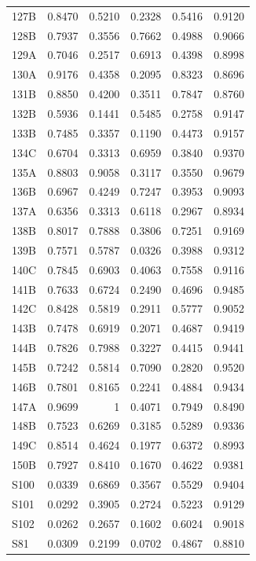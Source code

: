 \begin{longtable}{lrrrrr}
  127B & 0.8470 & 0.5210 & 0.2328 & 0.5416 & 0.9120 \\
  128B & 0.7937 & 0.3556 & 0.7662 & 0.4988 & 0.9066 \\
  129A & 0.7046 & 0.2517 & 0.6913 & 0.4398 & 0.8998 \\
  130A & 0.9176 & 0.4358 & 0.2095 & 0.8323 & 0.8696 \\
  131B & 0.8850 & 0.4200 & 0.3511 & 0.7847 & 0.8760 \\
  132B & 0.5936 & 0.1441 & 0.5485 & 0.2758 & 0.9147 \\
  133B & 0.7485 & 0.3357 & 0.1190 & 0.4473 & 0.9157 \\
  134C & 0.6704 & 0.3313 & 0.6959 & 0.3840 & 0.9370 \\
  135A & 0.8803 & 0.9058 & 0.3117 & 0.3550 & 0.9679 \\
  136B & 0.6967 & 0.4249 & 0.7247 & 0.3953 & 0.9093 \\
  137A & 0.6356 & 0.3313 & 0.6118 & 0.2967 & 0.8934 \\
  138B & 0.8017 & 0.7888 & 0.3806 & 0.7251 & 0.9169 \\
  139B & 0.7571 & 0.5787 & 0.0326 & 0.3988 & 0.9312 \\
  140C & 0.7845 & 0.6903 & 0.4063 & 0.7558 & 0.9116 \\
  141B & 0.7633 & 0.6724 & 0.2490 & 0.4696 & 0.9485 \\
  142C & 0.8428 & 0.5819 & 0.2911 & 0.5777 & 0.9052 \\
  143B & 0.7478 & 0.6919 & 0.2071 & 0.4687 & 0.9419 \\
  144B & 0.7826 & 0.7988 & 0.3227 & 0.4415 & 0.9441 \\
  145B & 0.7242 & 0.5814 & 0.7090 & 0.2820 & 0.9520 \\
  146B & 0.7801 & 0.8165 & 0.2241 & 0.4884 & 0.9434 \\
  147A & 0.9699 & 1 & 0.4071 & 0.7949 & 0.8490 \\
  148B & 0.7523 & 0.6269 & 0.3185 & 0.5289 & 0.9336 \\
  149C & 0.8514 & 0.4624 & 0.1977 & 0.6372 & 0.8993 \\
  150B & 0.7927 & 0.8410 & 0.1670 & 0.4622 & 0.9381 \\
  S100 & 0.0339 & 0.6869 & 0.3567 & 0.5529 & 0.9404 \\
  S101 & 0.0292 & 0.3905 & 0.2724 & 0.5223 & 0.9129 \\
  S102 & 0.0262 & 0.2657 & 0.1602 & 0.6024 & 0.9018 \\
  S81 & 0.0309 & 0.2199 & 0.0702 & 0.4867 & 0.8810 \\

\end{longtable}
